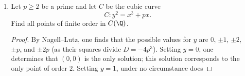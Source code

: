 \documentclass[11pt, oneside]{article}
\begin{document}
\begin{enumerate}
\begin{proof}
\end{proof}
(d) Prove that $R$ is a unique factorization domain.
\begin{proof}
Recall that
$$
R^* = \{ r\in R : \ord(r) = 0\}.
$$
By the definition of $R$, any $r\in R$ can be written as the product of a unit and a power of $p$. $p$ is irreducible, so the factorization of anything in $R$ into the product of a unit and a power of $p$ is unique. So $R$ is a UFD.
\end{proof}
%
%
%
\setcounter{enumi}{9}
\item Let $p\ge  2$ be a prime and let $C$ be the cubic curve 
$$
C : y^2 = x^3 + px.
$$
Find all points of finite order in $C(\Q)$.
\begin{proof}
By Nagell--Lutz, one finds that the possible values for $y$ are $0$, $\pm1$, $\pm2$, $\pm p$, and $\pm 2p$ (as their squares divide $D = -4p^3$). Setting $y=0$, one determines that $(0,0)$ is the only solution; this solution corresponds to the only point of order $2$. Setting $y=1$, under no circumstance does 

\end{proof}
\end{enumerate}
\end{document}
